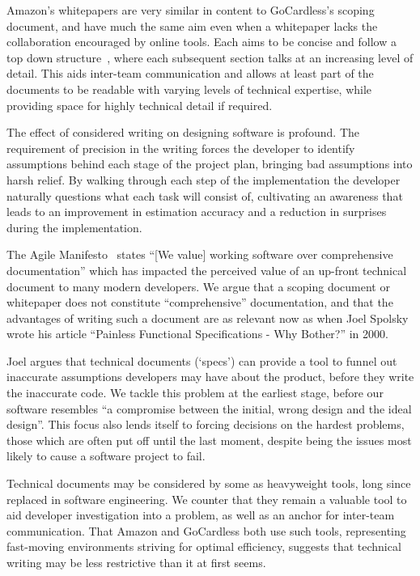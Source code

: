 \documentclass[11pt]{article}
\begin{document}
Amazon's whitepapers are very similar in content to GoCardless's scoping
document, and have much the same aim even when a whitepaper lacks the
collaboration encouraged by online tools. Each aims to be concise and follow a
top down structure~\cite{reportingAndWriting}, where each subsequent section
talks at an increasing level of detail. This aids inter-team communication and
allows at least part of the documents to be readable with varying levels of
technical expertise, while providing space for highly technical detail if
required.

The effect of considered writing on designing software is profound. The
requirement of precision in the writing forces the developer to identify
assumptions behind each stage of the project plan, bringing bad assumptions into
harsh relief. By walking through each step of the implementation the developer
naturally questions what each task will consist of, cultivating an awareness
that leads to an improvement in estimation accuracy and a reduction in surprises
during the implementation.

The Agile Manifesto~\cite{agileManifesto} states “[We value] working software
over comprehensive documentation” which has impacted the perceived value of an
up-front technical document to many modern developers. We argue that a scoping
document or whitepaper does not constitute “comprehensive” documentation, and
that the advantages of writing such a document are as relevant now as when Joel
Spolsky wrote his article “Painless Functional Specifications - Why Bother?” in
2000.

Joel argues that technical documents (`specs') can provide a tool to funnel out
inaccurate assumptions developers may have about the product, before they write
the inaccurate code. We tackle this problem at the earliest stage, before our
software resembles “a compromise between the initial, wrong design and the ideal
design”. This focus also lends itself to forcing decisions on the hardest
problems, those which are often put off until the last moment, despite being the
issues most likely to cause a software project to fail.

Technical documents may be considered by some as heavyweight tools, long since
replaced in software engineering. We counter that they remain a valuable tool to
aid developer investigation into a problem, as well as an anchor for inter-team
communication. That Amazon and GoCardless both use such tools, representing
fast-moving environments striving for optimal efficiency, suggests that
technical writing may be less restrictive than it at first seems.
\end{document}
